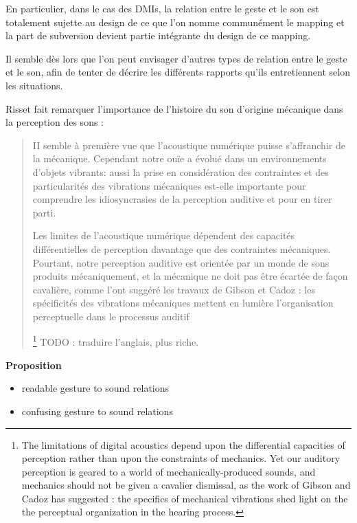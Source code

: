 En particulier, dans le cas des \glspl{DMI}, la relation entre le geste et le son est totalement sujette au design de ce que l'on nomme communément le \gls{mapping} et la part de subversion devient partie intégrante du design de ce mapping. 


Il semble dès lors que l'on peut envisager d'autres types de relation entre le geste et le son, afin de tenter de décrire les différents rapports qu'ils entretiennent selon les situations.

Risset fait remarquer l'importance de l'histoire du son d'origine mécanique dans la perception des sons \cite{risset_son_1992}: 

\begin{quotation}
II semble à première vue que l'acoustique numérique puisse s'affranchir de la mécanique. Cependant notre ouïe a évolué dans un environnements d'objets vibrants: aussi la prise en considération des contraintes et des particularités des vibrations mécaniques est-elle importante pour comprendre les idiosyncrasies de la perception auditive et pour en tirer parti.

Les limites de l'acoustique numérique dépendent des capacités différentielles de perception davantage que des contraintes mécaniques. Pourtant, notre perception auditive est orientée par un monde de sons produits mécaniquement, et la mécanique ne doit pas être écartée de façon cavalière, comme l'ont suggéré les travaux de Gibson et Cadoz : les spécificités des vibrations mécaniques mettent en lumière l'organisation perceptuelle dans le processus auditif


\footnote{The limitations of digital acoustics depend upon the differential capacities of perception rather than upon the constraints of mechanics. Yet our auditory perception is geared to a world of mechanically-produced sounds, and mechanics should not be given a cavalier dismissal, as the work of Gibson and Cadoz has suggested : the specifics of mechanical vibrations shed light on the the perceptual organization in the hearing process.} TODO : traduire l'anglais, plus riche.
\end{quotation}


\textbf{Proposition}
\vspace{-1em}
\begin{itemize}[noitemsep]
\item readable gesture to sound relations
\item confusing gesture to sound relations
\end{itemize}

